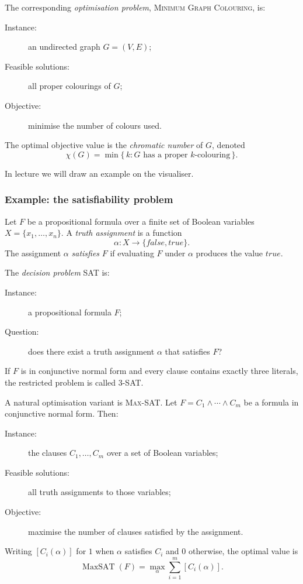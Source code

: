 \documentclass[11pt]{article}
\begin{document}
The corresponding \emph{optimisation problem}, \textsc{Minimum Graph
Colouring}, is:
\begin{description}
    \item[Instance:] an undirected graph $G=(V,E)$;
    \item[Feasible solutions:] all proper colourings of $G$;
    \item[Objective:] minimise the number of colours used.
\end{description}
The optimal objective value is the \emph{chromatic number} of $G$, denoted
\[
    \chi(G)=\min\{\,k:G\text{ has a proper }k\text{-colouring}\,\}.
\]

In lecture we will draw an example on the visualiser.

\subsubsection{Example: the satisfiability problem}

Let $F$ be a propositional formula over a finite set of Boolean variables
$X=\{x_1,\ldots,x_n\}$. A \emph{truth assignment} is a function
\[
    \alpha:X\longrightarrow\{\mathit{false},\mathit{true}\}.
\]
The assignment $\alpha$ \emph{satisfies} $F$ if evaluating $F$ under $\alpha$
produces the value $\mathit{true}$.

The \emph{decision problem} \textsc{SAT} is:
\begin{description}
    \item[Instance:] a propositional formula $F$;
    \item[Question:] does there exist a truth assignment $\alpha$ that satisfies
    $F$?
\end{description}
If $F$ is in conjunctive normal form and every clause contains exactly three
literals, the restricted problem is called \textsc{3-SAT}.

A natural optimisation variant is \textsc{Max-SAT}. Let
$F=C_1\land\cdots\land C_m$ be a formula in conjunctive normal form. Then:
\begin{description}
    \item[Instance:] the clauses $C_1,\ldots,C_m$ over a set of Boolean
    variables;
    \item[Feasible solutions:] all truth assignments to those variables;
    \item[Objective:] maximise the number of clauses satisfied by the
    assignment.
\end{description}
Writing $[C_i(\alpha)]$ for $1$ when $\alpha$ satisfies $C_i$ and $0$
otherwise, the optimal value is
\[
    \operatorname{MaxSAT}(F)
    =\max_{\alpha}\sum_{i=1}^{m}[C_i(\alpha)].
\]
\end{document}
